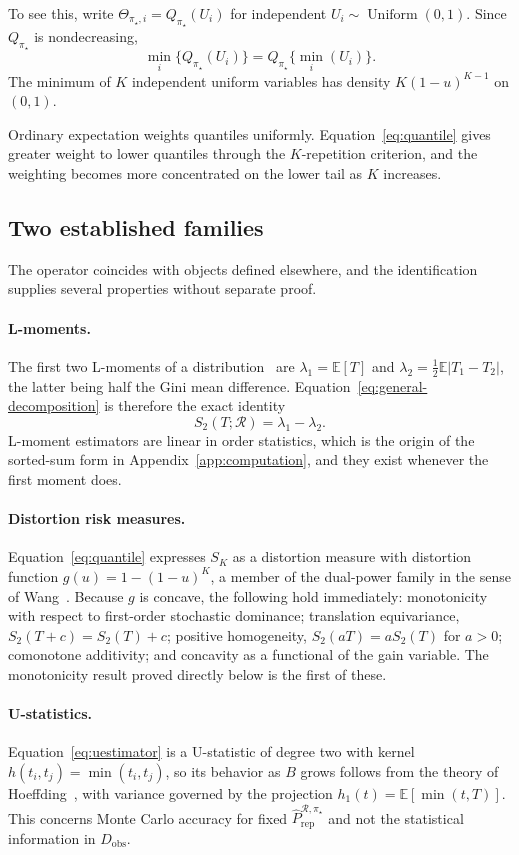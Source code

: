 \documentclass[11pt]{article}
\newcommand{\Regime}{\mathcal{R}}
\newcommand{\E}{\mathbb{E}}
\newcommand{\PRepHat}{\widehat{P}_{\mathrm{rep}}^{\Regime,\pi_\star}}
\theoremstyle{remark}
\begin{document}
To see this, write $\Theta_{\pi_\star,i}=Q_{\pi_\star}(U_i)$ for independent $U_i\sim\operatorname{Uniform}(0,1)$. Since $Q_{\pi_\star}$ is nondecreasing,
\[
\min_i\{Q_{\pi_\star}(U_i)\}
=
Q_{\pi_\star}\{\min_i(U_i)\}.
\]
The minimum of $K$ independent uniform variables has density $K(1-u)^{K-1}$ on $(0,1)$.

Ordinary expectation weights quantiles uniformly. Equation~\eqref{eq:quantile} gives greater weight to lower quantiles through the $K$-repetition criterion, and the weighting becomes more concentrated on the lower tail as $K$ increases.

\subsection{Two established families}
\label{app:families}

The operator coincides with objects defined elsewhere, and the identification supplies several properties without separate proof.

\paragraph{L-moments.}
The first two L-moments of a distribution~\cite{hosking1990lmoments} are $\lambda_1=\E[T]$ and $\lambda_2=\tfrac12\E|T_1-T_2|$, the latter being half the Gini mean difference. Equation~\eqref{eq:general-decomposition} is therefore the exact identity
\[
S_2(T;\Regime)=\lambda_1-\lambda_2 .
\]
L-moment estimators are linear in order statistics, which is the origin of the sorted-sum form in Appendix~\ref{app:computation}, and they exist whenever the first moment does.

\paragraph{Distortion risk measures.}
Equation~\eqref{eq:quantile} expresses $S_K$ as a distortion measure with distortion function $g(u)=1-(1-u)^{K}$, a member of the dual-power family in the sense of Wang~\cite{wang1996premium}. Because $g$ is concave, the following hold immediately: monotonicity with respect to first-order stochastic dominance; translation equivariance, $S_2(T+c)=S_2(T)+c$; positive homogeneity, $S_2(aT)=aS_2(T)$ for $a>0$; comonotone additivity; and concavity as a functional of the gain variable. The monotonicity result proved directly below is the first of these.

\paragraph{U-statistics.}
Equation~\eqref{eq:uestimator} is a U-statistic of degree two with kernel $h(t_i,t_j)=\min(t_i,t_j)$, so its behavior as $B$ grows follows from the theory of Hoeffding~\cite{hoeffding1948ustat}, with variance governed by the projection $h_1(t)=\E[\min(t,T)]$. This concerns Monte Carlo accuracy for fixed $\PRepHat$ and not the statistical information in $D_{\mathrm{obs}}$.
\end{document}
